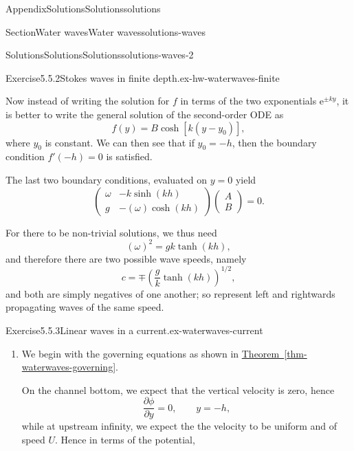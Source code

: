 \documentclass[oneside,10pt,]{book}
\newcommand{\xreffont}{\relax}
\numberwithin{equation}{section}
\newcommand{\e}{\mathrm{e}}
\newcommand{\pd}[2]{\frac{\partial#1}{\partial#2}}
\begin{document}
\begin{appendixptx}{Appendix}{Solutions}{}{Solutions}{}{}{solutions}
\begin{sectionptx}{Section}{Water waves}{}{Water waves}{}{}{solutions-waves}
\begin{solutions-subsection-numberless}{Solutions}{Solutions}{}{Solutions}{}{}{solutions-waves-2}
\begin{divisionsolution}{Exercise}{5.5.2}{Stokes waves in finite depth.}{ex-hw-waterwaves-finite}
%
\par
Now instead of writing the solution for \(f\) in terms of the two exponentials \(\e^{\pm ky}\), it is better to write the general solution of the second-order ODE as%
\begin{equation*}
f(y) = B \cosh[k(y - y_0)],
\end{equation*}
where \(y_0\) is constant. We can then see that if \(y_0 = -h\), then the boundary condition \(f'(-h) = 0\) is satisfied.%
\par
The last two boundary conditions, evaluated on \(y = 0\) yield%
\begin{equation}
\begin{pmatrix}
\omega & -k \sinh (kh) \\
g & -(\omega)\cosh(kh)
\end{pmatrix}
\begin{pmatrix}
A \\ B
\end{pmatrix}
= 0.\label{ex-hw-waterwaves-finite-3-6-2}
\end{equation}
%
\par
For there to be non-trivial solutions, we thus need%
\begin{equation*}
(\omega)^2 = gk \tanh(kh),
\end{equation*}
and therefore there are two possible wave speeds, namely%
\begin{equation*}
c = \mp \left(\frac{g}{k}\tanh(kh)\right)^{1/2},
\end{equation*}
and both are simply negatives of one another; so represent left and rightwards propagating waves of the same speed.%
\end{divisionsolution}%
\begin{divisionsolution}{Exercise}{5.5.3}{Linear waves in a current.}{ex-waterwaves-current}%
\begin{enumerate}[font=\bfseries,label=(\alph*),ref=\alph*]%
\item[(a)]\noindent\hypertarget{ex-waterwaves-current-3-2-main}{}We begin with the governing equations as shown in \hyperref[thm-waterwaves-governing]{Theorem~{\xreffont\ref{thm-waterwaves-governing}}}.%
\par
On the channel bottom, we expect that the vertical velocity is zero, hence%
\begin{equation*}
\pd{\phi}{y} = 0, \qquad y = -h,
\end{equation*}
while at upstream infinity, we expect the the velocity to be uniform and of speed \(U\). Hence in terms of the potential,%

\end{enumerate}
\end{divisionsolution}
\end{solutions-subsection-numberless}
\end{sectionptx}
\end{appendixptx}
\end{document}
